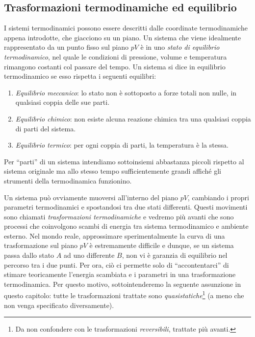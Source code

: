 \subsection{Trasformazioni termodinamiche ed equilibrio}
I sistemi termodinamici possono essere descritti dalle coordinate
termodinamiche appena introdotte, che giacciono su un piano. Un
sistema che viene idealmente rappresentato da un punto fisso sul
piano $pV$ è in uno \textit{stato di equilibrio termodinamico},
nel quale le condizioni di pressione, volume e temperatura rimangono
costanti col passare del tempo.
Un sistema si dice in equilibrio termodinamico se esso rispetta i seguenti equilibri:
\begin{enumerate}
    \item \textit{Equilibrio meccanico}: lo stato non è sottoposto a forze totali non nulle,
    in qualsiasi coppia delle sue parti.

    \item \textit{Equilibrio chimico}: non esiste alcuna reazione chimica tra una qualsiasi
    coppia di parti del sistema.

    \item \textit{Equilibrio termico}: per ogni coppia di parti, la temperatura è la stessa.
\end{enumerate}

\noindent Per ``parti'' di un sistema intendiamo sottoinsiemi
abbastanza piccoli rispetto al sistema originale ma allo stesso
tempo sufficientemente grandi affiché gli strumenti della termodinamica
funzionino.


Un sistema può ovviamente muoversi all'interno del piano $pV$, cambiando
i propri parametri termodinamici e spostandosi tra due stati differenti.
Questi movimenti sono chiamati \textit{trasformazioni termodinamiche} e
vedremo più avanti che sono processi che coinvolgono scambi di energia
tra sistema termodinamico e ambiente esterno. Nel mondo reale, approssimare
sperimentalmente la curva di una trasformazione sul piano $pV$ è
estremamente difficile e dunque, se un sistema passa dallo stato $A$
ad uno differente $B$, non vi è garanzia di equilibrio nel percorso
tra i due punti. Per ora, ciò ci permette solo di ``accontentarci'' di
stimare teoricamente l'energia scambiata e i parametri in una trasformazione
termodinamica. Per questo motivo, sottointenderemo la seguente assunzione
in questo capitolo: tutte le trasformazioni trattate sono \textit{quasistatiche}\footnote{Da non confondere con le trasformazioni \textit{reversibili}, trattate più avanti.}
(a meno che non venga specificato diversamente).

